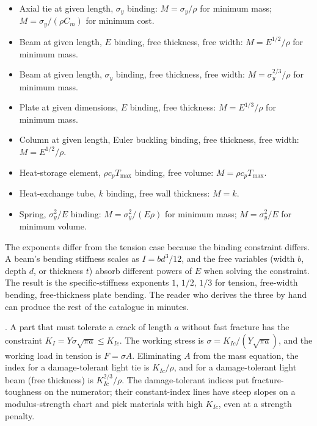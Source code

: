 \begin{itemize}[leftmargin=*]
\item Axial tie at given length, $\sigma_y$ binding: $M = \sigma_y /
  \rho$ for minimum mass; $M = \sigma_y / (\rho C_m)$ for minimum cost.
\item Beam at given length, $E$ binding, free thickness, free width:
  $M = E^{1/2} / \rho$ for minimum mass.
\item Beam at given length, $\sigma_y$ binding, free thickness, free
  width: $M = \sigma_y^{2/3} / \rho$ for minimum mass.
\item Plate at given dimensions, $E$ binding, free thickness: $M =
  E^{1/3} / \rho$ for minimum mass.
\item Column at given length, Euler buckling binding, free thickness,
  free width: $M = E^{1/2} / \rho$.
\item Heat-storage element, $\rho c_p T_{\max}$ binding, free volume:
  $M = \rho c_p T_{\max}$.
\item Heat-exchange tube, $k$ binding, free wall thickness: $M = k$.
\item Spring, $\sigma_y^2 / E$ binding: $M = \sigma_y^2 / (E \rho)$
  for minimum mass; $M = \sigma_y^2 / E$ for minimum volume.
\end{itemize}

The exponents differ from the tension case because the binding
constraint differs. A beam's bending stiffness scales as $I = b d^3/12$,
and the free variables (width $b$, depth $d$, or thickness $t$) absorb
different powers of $E$ when solving the constraint. The result is the
specific-stiffness exponents $1$, $1/2$, $1/3$ for tension,
free-width bending, free-thickness plate bending. The reader who
derives the three by hand can produce the rest of the catalogue in
minutes.

. A part that must
tolerate a crack of length $a$ without fast fracture has the
constraint $K_I = Y \sigma \sqrt{\pi a} \leq K_{Ic}$. The working
stress is $\sigma = K_{Ic} / (Y \sqrt{\pi a})$, and the working load
in tension is $F = \sigma A$. Eliminating $A$ from the mass
equation, the index for a damage-tolerant light tie is $K_{Ic} /
\rho$, and for a damage-tolerant light beam (free thickness) is
$K_{Ic}^{2/3} / \rho$. The damage-tolerant indices put fracture-
toughness on the numerator; their constant-index lines have steep
slopes on a modulus-strength chart and pick materials with high
$K_{Ic}$, even at a strength penalty.

